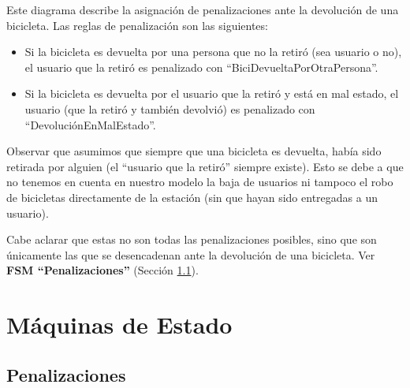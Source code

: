 \documentclass[a4paper, 10pt, twoside]{article}
\begin{document}
Este diagrama describe la asignación de penalizaciones ante la devolución de una bicicleta. Las reglas de penalización son las siguientes:
\begin{itemize}
 \item Si la bicicleta es devuelta por una persona que no la retiró (sea usuario o no), el usuario que la retiró es penalizado con
 ``BiciDevueltaPorOtraPersona''.
 \item Si la bicicleta es devuelta por el usuario que la retiró y está en mal estado, el usuario (que la retiró y también devolvió) es penalizado
 con ``DevoluciónEnMalEstado''.
\end{itemize}
Observar que asumimos que siempre que una bicicleta es devuelta, había sido retirada por alguien (el ``usuario que la retiró'' siempre existe).
Esto se debe a que no tenemos en cuenta en nuestro modelo la baja de usuarios ni tampoco el robo de bicicletas directamente de la estación (sin que hayan sido entregadas a un usuario).

Cabe aclarar que estas no son todas las penalizaciones posibles, sino que son únicamente las que se desencadenan ante la devolución de una bicicleta.
Ver {\bf FSM ``Penalizaciones''} (Sección \ref{fsm:penalizaciones}).




\section{Máquinas de Estado}

\subsection{Penalizaciones} \label{fsm:penalizaciones}
\end{document}
